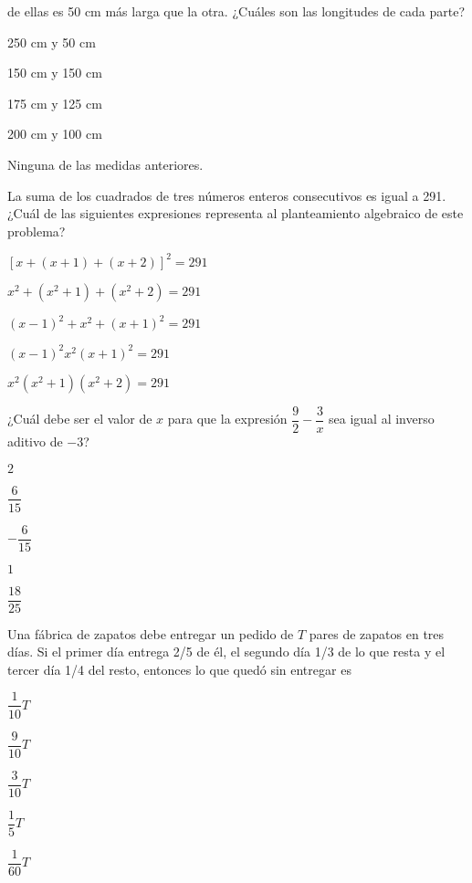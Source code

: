 \documentclass{sn-guia}
\begin{document}
\begin{problemas}
    de ellas es 50 cm más larga que la otra. ¿Cuáles son las longitudes de cada parte?
    \begin{alternativas}[]
        \item 250 cm y 50 cm
        \item 150 cm y 150 cm
        \item 175 cm y 125 cm
        \item 200 cm y 100 cm
        \item Ninguna de las medidas anteriores.
    \end{alternativas}
    \problema La suma de los cuadrados de tres números enteros consecutivos es igual a
    291. ¿Cuál de las siguientes expresiones representa al planteamiento algebraico de 
    este problema?
    \begin{alternativas}[]
        \item $[x + (x+1) + (x+2)]^2 = 291$
        \item $x^2 +(x^2+1) + (x^2 +2) = 291$
        \item $(x-1)^2 + x^2 + (x+1)^2 = 291$
        \item $(x-1)^2x^2(x+1)^2=291$
        \item $x^2(x^2+1)(x^2+2)=291$
    \end{alternativas}
    \problema ¿Cuál debe ser el valor de $x$ para que la expresión $\dfrac{9}{2}-\dfrac{3}{x}$
    sea igual al inverso aditivo de $-3$?
    \begin{alternativas}[]
        \item $2$
        \item $\dfrac{6}{15}$
        \item $-\dfrac{6}{15}$
        \item $1$
        \item $\dfrac{18}{25}$
    \end{alternativas}
    \problema Una fábrica de zapatos debe entregar un pedido de $T$ pares de zapatos en 
    tres días. Si el primer día entrega 2/5 de él, el segundo día 1/3 de lo que resta
    y el tercer día 1/4 del resto, entonces lo que quedó sin entregar es
    \begin{alternativas}[]
        \item $\dfrac{1}{10}T$
        \item $\dfrac{9}{10}T$
        \item $\dfrac{3}{10}T$
        \item $\dfrac{1}{5}T$
        \item $\dfrac{1}{60}T$
    \end{alternativas}

\end{problemas}
\end{document}
